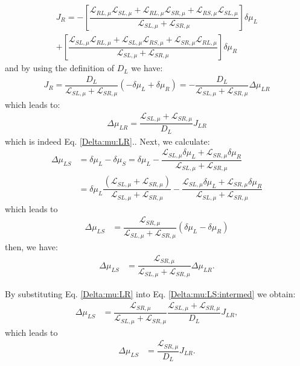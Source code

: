 {\begin{multline*}
J_{R}= 
-\left[
\dfrac{\mathcal{L}_{RL,\mu}\mathcal{L}_{SL,\mu}+\mathcal{L}_{RL,\mu}\mathcal{L}_{SR,\mu}+\mathcal{L}_{RS,\mu}\mathcal{L}_{SL,\mu}}{\mathcal{L}_{SL,\mu}+\mathcal{L}_{SR,\mu}}\right]\delta\mu_{L}
\\+\left[
\dfrac{
\mathcal{L}_{SL,\mu}\mathcal{L}_{RL,\mu}
+\mathcal{L}_{SL,\mu}\mathcal{L}_{RS,\mu}
+\mathcal{L}_{SR,\mu}\mathcal{L}_{RL,\mu}
}{\mathcal{L}_{SL,\mu}+\mathcal{L}_{SR,\mu}}\right]\delta\mu_{R}
\end{multline*}
and by using the definition of $D_{L}$ we have:
\begin{align*}
J_{R}=\dfrac{D_{L}}{\mathcal{L}_{SL,\mu}+\mathcal{L}_{SR,\mu}}(-\delta\mu_{L}+\delta\mu_{R})=-\dfrac{D_{L}}{\mathcal{L}_{SL,\mu}+\mathcal{L}_{SR,\mu}}\Delta\mu_{LR}
\end{align*}
which leads to:
\begin{align*}
\Delta\mu_{LR}=\dfrac{\mathcal{L}_{SL,\mu}+\mathcal{L}_{SR,\mu}}{D_{L}}J_{LR}
\end{align*} which is indeed Eq. \eqref{Delta:mu:LR}.}. Next, we calculate:
\begin{align*}
\Delta\mu_{LS}&=\delta\mu_{L}-\delta\mu_{S}
=
\delta\mu_{L}-\dfrac{\mathcal{L}_{SL,\mu}\delta\mu_{L}+\mathcal{L}_{SR,\mu}\delta\mu_{R}}{\mathcal{L}_{SL,\mu}+\mathcal{L}_{SR,\mu}}
\\
&=\delta\mu_{L}\dfrac{(\mathcal{L}_{SL,\mu}+\mathcal{L}_{SR,\mu})}{\mathcal{L}_{SL,\mu}+\mathcal{L}_{SR,\mu}}-\dfrac{\mathcal{L}_{SL,\mu}\delta\mu_{L}+\mathcal{L}_{SR,\mu}\delta\mu_{R}}{\mathcal{L}_{SL,\mu}+\mathcal{L}_{SR,\mu}}
\end{align*}
which leads to
\begin{align*}
\Delta\mu_{LS}
&=\dfrac{\mathcal{L}_{SR,\mu}}{\mathcal{L}_{SL,\mu}+\mathcal{L}_{SR,\mu}}(\delta\mu_{L}-\delta\mu_{R})
\end{align*}
then, we have:
\begin{align}\label{Delta:mu:LS:intermed}
\Delta\mu_{LS}
&=\dfrac{\mathcal{L}_{SR,\mu}}{\mathcal{L}_{SL,\mu}+\mathcal{L}_{SR,\mu}}\Delta\mu_{LR}.
\end{align}

By substituting Eq. \eqref{Delta:mu:LR} into Eq. \eqref{Delta:mu:LS:intermed} we obtain:
\begin{align}\label{Delta:mu:LS:intermed2}
\Delta\mu_{LS}
&=\dfrac{\mathcal{L}_{SR,\mu}}{\mathcal{L}_{SL,\mu}+\mathcal{L}_{SR,\mu}}\dfrac{\mathcal{L}_{SL,\mu}+\mathcal{L}_{SR,\mu}}{D_{L}}J_{LR},
\end{align}
which leads to
\begin{align}\label{Delta:mu:LS}
\Delta\mu_{LS}
&=\dfrac{\mathcal{L}_{SR,\mu}}{D_{L}}J_{LR}.
\end{align}

